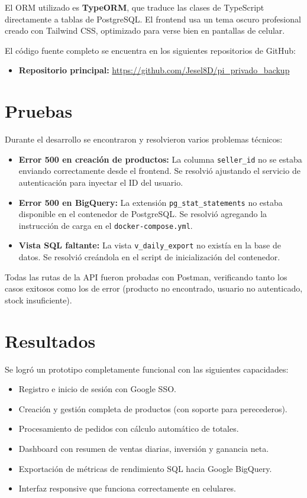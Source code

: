 \documentclass[12pt, a4paper]{article}
\begin{document}
El ORM utilizado es \textbf{TypeORM}, que traduce las clases de TypeScript directamente a tablas de PostgreSQL. El frontend usa un tema oscuro profesional creado con Tailwind CSS, optimizado para verse bien en pantallas de celular.

El código fuente completo se encuentra en los siguientes repositorios de GitHub:
\begin{itemize}
    \item \textbf{Repositorio principal:} \url{https://github.com/Jesel8D/pi_privado_backup}
\end{itemize}

\section{Pruebas}
Durante el desarrollo se encontraron y resolvieron varios problemas técnicos:

\begin{itemize}
    \item \textbf{Error 500 en creación de productos:} La columna \texttt{seller\_id} no se estaba enviando correctamente desde el frontend. Se resolvió ajustando el servicio de autenticación para inyectar el ID del usuario.
    \item \textbf{Error 500 en BigQuery:} La extensión \texttt{pg\_stat\_statements} no estaba disponible en el contenedor de PostgreSQL. Se resolvió agregando la instrucción de carga en el \texttt{docker-compose.yml}.
    \item \textbf{Vista SQL faltante:} La vista \texttt{v\_daily\_export} no existía en la base de datos. Se resolvió creándola en el script de inicialización del contenedor.
\end{itemize}

Todas las rutas de la API fueron probadas con Postman, verificando tanto los casos exitosos como los de error (producto no encontrado, usuario no autenticado, stock insuficiente).

\section{Resultados}
Se logró un prototipo completamente funcional con las siguientes capacidades:
\begin{itemize}
    \item Registro e inicio de sesión con Google SSO.
    \item Creación y gestión completa de productos (con soporte para perecederos).
    \item Procesamiento de pedidos con cálculo automático de totales.
    \item Dashboard con resumen de ventas diarias, inversión y ganancia neta.
    \item Exportación de métricas de rendimiento SQL hacia Google BigQuery.
    \item Interfaz responsive que funciona correctamente en celulares.
\end{itemize}
\end{document}
